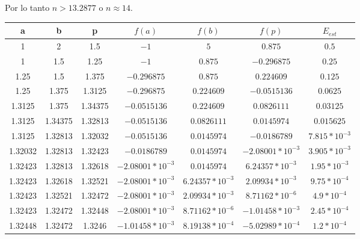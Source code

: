 \documentclass[12pt]{article}
\begin{document}
Por lo tanto $n > 13.2877$ o  $n \approx 14$.
\begin{center}
    \begin{tabular}{|c|c|c|c|c|c|c|}
        \hline
        a & b&p&$f(a)$&$f(b)$&$f(p)$&$E_{est}$\\
        \hline
        1       & 2         &  1.5    & $-1$                & $5$                       & $0.875$           & $0.5$\\
        1       & 1.5       &  1.25   & $-1$                & $0.875$                   & $-0.296875$       & $0.25$\\
        1.25    & 1.5       &  1.375  &$-0.296875$          & $0.875$                   & $0.224609$        & $0.125$\\
        1.25    & 1.375     &  1.3125 &$-0.296875$          & $0.224609$                & $-0.0515136$      & $0.0625$\\
        1.3125  & 1.375     &  1.34375& $-0.0515136$        & $0.224609$                & $0.0826111$       & $0.03125$\\
        1.3125  & 1.34375   &  1.32813& $-0.0515136$        & $0.0826111$               & $0.0145974$       & $0.015625$\\
        1.3125  & 1.32813   &  1.32032& $-0.0515136$        & $0.0145974$               & $-0.0186789$      & $7.815*10^{-3}$\\
        1.32032 & 1.32813   &  1.32423& $-0.0186789$        & $0.0145974$               & $-2.08001*10^{-3}$& $3.905*10^{-3}$\\
        1.32423 & 1.32813   &  1.32618& $-2.08001*10^{-3}$  & $0.0145974$               & $6.24357*10^{-3}$ & $1.95*10^{-3}$\\
        1.32423 & 1.32618   &  1.32521& $-2.08001*10^{-3}$  & $6.24357*10^{-3}$         & $2.09934*10^{-3}$ & $9.75*10^{-4}$\\
        1.32423 & 1.32521   &  1.32472& $-2.08001*10^{-3}$  & $2.09934*10^{-3}$         &  $8.71162*10^{-6}$& $4.9*10^{-4}$\\
        1.32423 & 1.32472   &  1.32448& $-2.08001*10^{-3}$  & $8.71162*10^{-6}$         & $-1.01458*10^{-3}$& $2.45*10^{-4}$\\
        1.32448 & 1.32472   &  1.3246& $-1.01458*10^{-3}$  & $8.19138*10^{-4}$         &  $-5.02989*10^{-4}$& $1.2*10^{-4}$\\
        \hline
      \end{tabular} 
\end{center}
\end{document}
